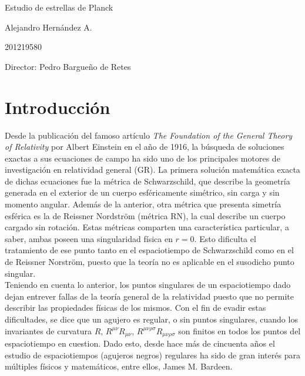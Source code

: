 \documentclass{article}
\numberwithin{equation}{section}
\begin{document}
\begin{center}
\Huge
Estudio de estrellas de Planck 

\vspace{3mm}
\Large Alejandro Hernández A.

\large
201219580


\vspace{2mm}
\Large
Director: Pedro Bargueño de Retes

\normalsize
\vspace{2mm}

\date{}
\end{center}


\normalsize
\section{Introducción}

Desde la publicación del famoso artículo \textit{The Foundation of the General Theory of Relativity} \cite{einstein} por Albert Einstein en el año de 1916, la búsqueda de soluciones exactas a sus ecuaciones de campo ha sido uno de los principales motores de investigación en relatividad general (GR). La primera solución matemática exacta de dichas ecuaciones fue la métrica de Schwarzschild, que describe la geometría generada en el exterior de un cuerpo esféricamente simétrico, sin carga y sin momento angular. Además de la anterior, otra métrica que presenta simetría esférica es la de Reissner Nordström (métrica RN), la cual describe un cuerpo cargado sin rotación. Estas métricas comparten una característica particular, a saber, ambas poseen una singularidad física en $r = 0$. Esto dificulta el tratamiento de ese punto tanto en el espaciotiempo de Schwarzschild como en el de Reissner Norström, puesto que la teoría no es aplicable en el susodicho punto singular.\\

Teniendo en cuenta lo anterior, los puntos singulares de un espaciotiempo dado dejan entrever fallas de la teoría general de la relatividad puesto que no permite describir las propiedades físicas de los mismos. Con el fin de evadir estas dificultades, se dice que un agujero es regular, o sin puntos singulares, cuando los invariantes de curvatura $R$, $R^{\mu \nu}R_{\mu \nu}$, $R^{\mu \nu \rho \sigma}R_{\mu \nu \rho \sigma}$ son finitos en todos los puntos del espaciotiempo en cuestion. Dado esto, desde hace más de cincuenta años el estudio de espaciotiempos (agujeros negros) regulares ha sido de gran interés para múltiples físicos y matemáticos, entre ellos, James M. Bardeen. \\
\end{document}
